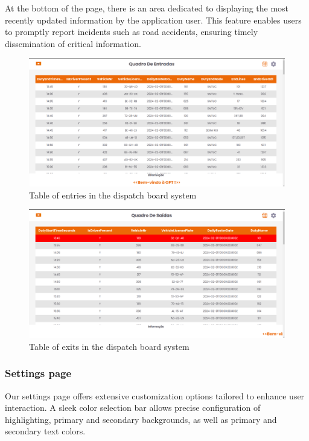 \documentclass[10pt]{article}
\begin{document}
        At the bottom of the page, there is an area dedicated to displaying the most recently updated information by the application user. This feature enables users to promptly report incidents such as road accidents, ensuring timely dissemination of critical information.

        \begin{figure}[htbp]
            \centering
            \includegraphics[width=1\textwidth]{table_of_entries}
            \caption{Table of entries in the dispatch board system}
            \label{fig:table_of_entries}
        \end{figure}
        \vfill

        \begin{figure}[htbp]
            \centering
            \includegraphics[width=1\textwidth]{table_of_exits}
            \caption{Table of exits in the dispatch board system}
            \label{fig:table_of_exits}
        \end{figure}

        \subsubsection{Settings page}

        Our settings page offers extensive customization options tailored to enhance user interaction. A sleek color selection bar allows precise configuration of highlighting, primary and secondary backgrounds, as well as primary and secondary text colors. 
        
\end{document}
